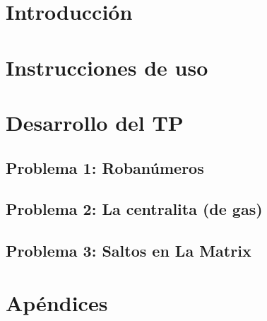 \documentclass[12pt, a4paper, twoside]{article}
\begin{document}
{}
\newpage{\pagestyle{empty}\cleardoublepage}
\setcounter{page}{1}

\newpage{\pagestyle{empty}\tableofcontents\cleardoublepage}

\begin{TP2}
\section{Introducción}\label{sec:introduccion}

\newpage
\section{Instrucciones de uso}\label{sec:instrucciones}

\newpage

\section{Desarrollo del TP}\label{sec:desarrollo}
  
  \subsection{Problema 1: Robanúmeros}\label{subsec:ej1}
  
  \newpage
  
  \subsection{Problema 2: La centralita (de gas)}\label{subsec:ej2}
  
  \newpage
  
  \subsection{Problema 3: Saltos en La Matrix}
  \label{subsec:ej3}
  \newpage

\section{Apéndices}
  

\end{TP2}
\end{document}
